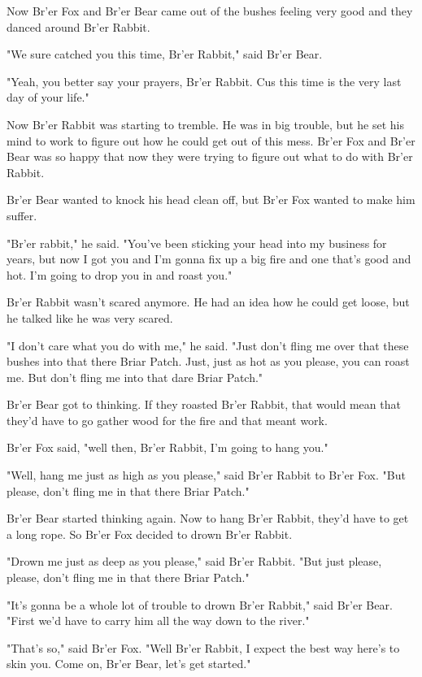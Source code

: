 Now Br'er Fox and Br'er Bear came out of the bushes feeling very good and they danced around Br'er Rabbit.

"We sure catched you this time, Br'er Rabbit," said Br'er Bear.

"Yeah, you better say your prayers, Br'er Rabbit. Cus this time is the very last day of your life."

Now Br'er Rabbit was starting to tremble. He was in big trouble, but he set his mind to work to figure out how he could get out of this mess. Br'er Fox and Br'er Bear was so happy that now they were trying to figure out what to do with Br'er Rabbit.

Br'er Bear wanted to knock his head clean off, but Br'er Fox wanted to make him suffer.

"Br'er rabbit," he said. "You've been sticking your head into my business for years, but now I got you and I'm gonna fix up a big fire and one that's good and hot. I'm going to drop you in and roast you."

Br'er Rabbit wasn't scared anymore. He had an idea how he could get loose, but he talked like he was very scared.

"I don't care what you do with me," he said. "Just don't fling me over that these bushes into that there Briar Patch. Just, just as hot as you please, you can roast me. But don't fling me into that dare Briar Patch."

Br'er Bear got to thinking. If they roasted Br'er Rabbit, that would mean that they'd have to go gather wood for the fire and that meant work.

Br'er Fox said, "well then, Br'er Rabbit, I'm going to hang you."

"Well, hang me just as high as you please," said Br'er Rabbit to Br'er Fox. "But please, don't fling me in that there Briar Patch."

Br'er Bear started thinking again. Now to hang Br'er Rabbit, they'd have to get a long rope. So Br'er Fox decided to drown Br'er Rabbit.

"Drown me just as deep as you please," said Br'er Rabbit. "But just please, please, don't fling me in that there Briar Patch."

"It's gonna be a whole lot of trouble to drown Br'er Rabbit," said Br'er Bear. "First we'd have to carry him all the way down to the river."

"That's so," said Br'er Fox. "Well Br'er Rabbit, I expect the best way here's to skin you. Come on, Br'er Bear, let's get started."

